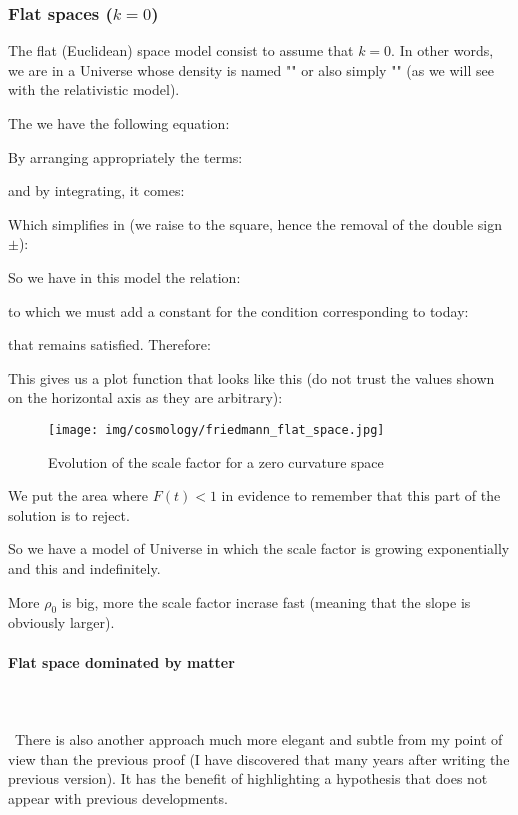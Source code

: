 	\subsubsection{Flat spaces ($k=0$)}
	The flat (Euclidean) space model consist to assume that $k=0$. In other words, we are in a Universe whose density is named "" or also simply "" (as we will see with the relativistic model).

	The we have the following equation:
	
	By arranging appropriately the terms:
	
	and by integrating, it comes:
	
	Which simplifies in (we raise to the square, hence the removal of the double sign $\pm$):
	
	So we have in this model the relation:
	
	to which we must add a constant for the condition corresponding to today:
	
	that remains satisfied. Therefore:
	
	This gives us a plot function that looks like this (do not trust the values shown on the horizontal axis as they are arbitrary):
	\begin{figure}[H]
		\begin{center}
		\texttt{[image: img/cosmology/friedmann\_flat\_space.jpg]}
		\end{center}	
		\caption{Evolution of the scale factor for a zero curvature space}
	\end{figure}
	We put the area where $F(t)<1$ in evidence to remember that this part of the solution is to reject.

	So we have a model of Universe in which the scale factor is growing exponentially and this and indefinitely.
	\begin{tcolorbox}[title=Remark,colframe=black,arc=10pt]
	More $\rho_0$ is big, more the scale factor incrase fast (meaning that the slope is obviously larger).
	\end{tcolorbox}
	
	\paragraph{Flat space dominated by matter}\mbox{}\\\\\
	There is also another approach much more elegant and subtle from my point of view than the previous proof (I have discovered that many years after writing the previous version). It has the benefit of highlighting a hypothesis that does not appear with previous developments.

